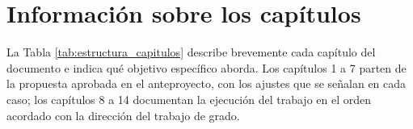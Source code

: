 

\section{Información sobre los capítulos}

La Tabla \ref{tab:estructura_capitulos} describe brevemente cada capítulo del documento e indica qué objetivo específico aborda. Los capítulos 1 a 7 parten de la propuesta aprobada en el anteproyecto, con los ajustes que se señalan en cada caso; los capítulos 8 a 14 documentan la ejecución del trabajo en el orden acordado con la dirección del trabajo de grado.

